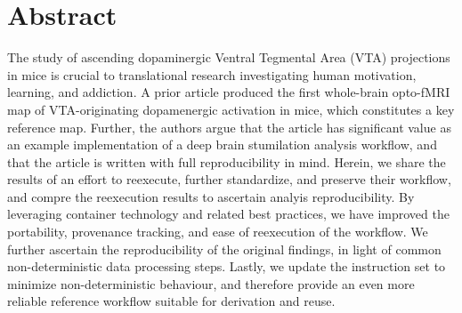 \section{Abstract}

The study of ascending dopaminergic Ventral Tegmental Area (VTA) projections in mice is crucial to translational research investigating human motivation, learning, and addiction.
A prior article produced the first whole-brain opto-fMRI map of VTA-originating dopamenergic activation in mice, which constitutes a key reference map.
Further, the authors argue that the article has significant value as an example implementation of a deep brain stumilation analysis workflow, and that the article is written with full reproducibility in mind.
Herein, we share the results of an effort to reexecute, further standardize, and preserve their workflow, and compre the reexecution results to ascertain analyis reproducibility.
By leveraging container technology and related best practices, we have improved the portability, provenance tracking, and ease of reexecution of the workflow.
We further ascertain the reproducibility of the original findings, in light of common non-deterministic data processing steps.
Lastly, we update the instruction set to minimize non-deterministic behaviour, and therefore provide an even more reliable reference workflow suitable for derivation and reuse.
